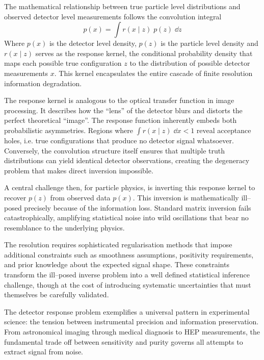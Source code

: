 \begin{definition}
    The mathematical relationship between true particle level distributions and observed detector level measurements follows the convolution integral
    \[
        \label{eq:forward-folding}
        p(x) = \int r(x\mid z)\;p(z)\; \dd z
    \]
    Where \(p(x)\) is the detector level density, \(p(z)\) is the particle level density and \(r(x\mid z)\) serves as the response kernel, the conditional probability density that maps each possible true configuration \(z\) to the distribution of possible detector measurements \(x\).
    This kernel encapsulates the entire cascade of finite resolution information degradation.
    
    The response kernel is analogous to the optical transfer function in image processing.
    It describes how the ``lens'' of the detector blurs and distorts the perfect theoretical ``image''.
    The response function inherently embeds both probabilistic asymmetries.
    Regions where \(\int r(x\mid z)\;\dd x < 1\) reveal acceptance holes, i.e. true configurations that produce no detector signal whatsoever.
    Conversely, the convolution structure itself ensures that multiple truth distributions can yield identical detector observations, creating the degeneracy problem that makes direct inversion impossible.
    
    A central challenge then, for particle physics, is inverting this response kernel to recover \(p(z)\) from observed data \(p(x)\).
    This inversion is mathematically ill--posed precisely because of the information loss.
    Standard matrix inversion fails catastrophically, amplifying statistical noise into wild oscillations that bear no resemblance to the underlying physics.
    
    The resolution requires sophisticated regularisation methods that impose additional constraints such as smoothness assumptions, positivity requirements, and prior knowledge about the expected signal shape.
    These constraints transform the ill--posed inverse problem into a well defined statistical inference challenge, though at the cost of introducing systematic uncertainties that must themselves be carefully validated.
    
    The detector response problem exemplifies a universal pattern in experimental science: the tension between instrumental precision and information preservation.
    From astronomical imaging through medical diagnosis to HEP measurements, the fundamental trade off between sensitivity and purity governs all attempts to extract signal from noise.


\end{definition}
